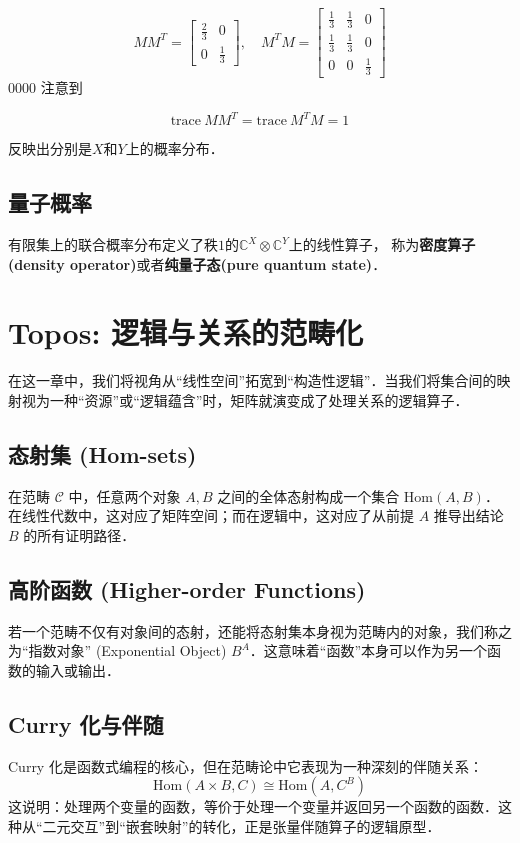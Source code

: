 \documentclass[10pt, openany]{book}
\begin{document}
$$
MM^T = \begin{bmatrix}
\frac{2}{3} & 0 \\
0 & \frac{1}{3}
\end{bmatrix},\quad 
M^T M = \begin{bmatrix}
\frac{1}{3} & \frac{1}{3} & 0 \\
\frac{1}{3} & \frac{1}{3} & 0 \\
0 & 0 & \frac{1}{3}
\end{bmatrix}
$$
0000
注意到

$$
\text{trace} \ MM^T = \text{trace} \ M^T M = 1
$$

反映出分别是$X$和$Y$上的概率分布．

\section{量子概率}

有限集上的联合概率分布定义了秩$1$的$\mathbb C^X \otimes \mathbb C^Y$上的线性算子，
称为\textbf{密度算子(density operator)}或者\textbf{纯量子态(pure quantum state)}．


\chapter{Topos: 逻辑与关系的范畴化}

在这一章中，我们将视角从“线性空间”拓宽到“构造性逻辑”．当我们将集合间的映射视为一种“资源”或“逻辑蕴含”时，矩阵就演变成了处理关系的逻辑算子．

\section{态射集 (Hom-sets)}
在范畴 $\mathcal{C}$ 中，任意两个对象 $A, B$ 之间的全体态射构成一个集合 $\mathrm{Hom}(A, B)$．在线性代数中，这对应了矩阵空间；而在逻辑中，这对应了从前提 $A$ 推导出结论 $B$ 的所有证明路径．

\section{高阶函数 (Higher-order Functions)}
若一个范畴不仅有对象间的态射，还能将态射集本身视为范畴内的对象，我们称之为“指数对象” (Exponential Object) $B^A$．这意味着“函数”本身可以作为另一个函数的输入或输出．

\section{Curry 化与伴随}
Curry 化是函数式编程的核心，但在范畴论中它表现为一种深刻的伴随关系：
\begin{equation}
\mathrm{Hom}(A \times B, C) \cong \mathrm{Hom}(A, C^B)
\end{equation}
这说明：处理两个变量的函数，等价于处理一个变量并返回另一个函数的函数．这种从“二元交互”到“嵌套映射”的转化，正是张量伴随算子的逻辑原型．
\end{document}
